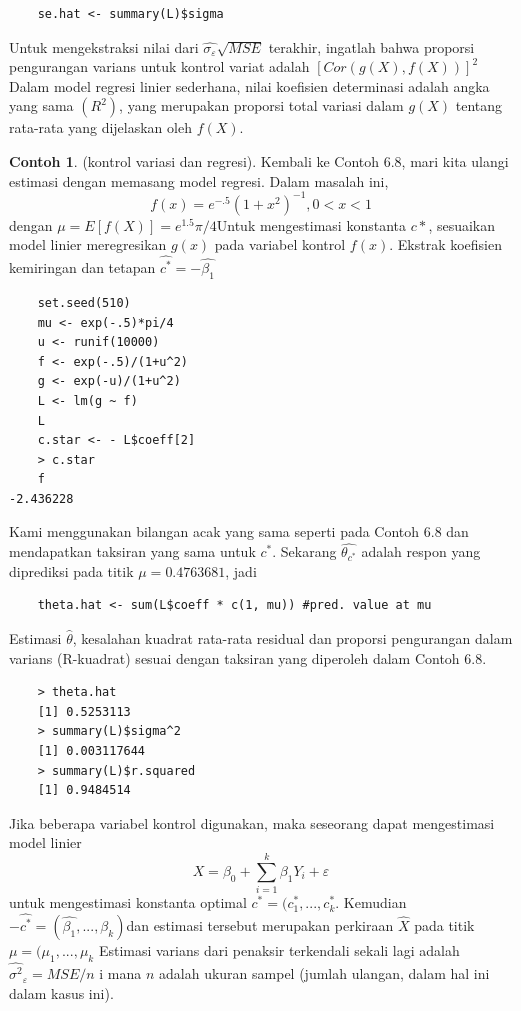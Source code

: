 \documentclass[a4paper,12pt]{article}
\theoremstyle{definition}
\newtheorem{example}{Contoh}[section]
\begin{document}
\begin{lstlisting}
    se.hat <- summary(L)$sigma
\end{lstlisting}
Untuk mengekstraksi nilai dari $\widehat{\sigma _{\varepsilon }}\sqrt{MSE}$
terakhir, ingatlah bahwa proporsi pengurangan varians untuk kontrol variat adalah $\left [ Cor(g(X),f(X)) \right ]^{2}$Dalam model regresi linier sederhana, nilai koefisien determinasi adalah angka yang sama $(R^{2})$, yang merupakan proporsi total variasi dalam $g(X)$ tentang rata-rata yang dijelaskan oleh $f (X)$.
\begin{example}
(kontrol variasi dan regresi). Kembali ke Contoh 6.8,
mari kita ulangi estimasi dengan memasang model regresi. Dalam masalah ini,
\begin{equation*}
    f(x)=e^{-.5}(1+x^{2})^{-1},0< x< 1
\end{equation*}
dengan $\mu=E\left [f(X)  \right ]=e^{1.5}\pi /4$Untuk mengestimasi konstanta $c{*}$, sesuaikan model linier
meregresikan $g(x)$ pada variabel kontrol $f (x)$. Ekstrak koefisien kemiringan dan tetapan $\widehat{c^{*}}=-\widehat{\beta_{1}}$
\begin{lstlisting}
    set.seed(510)
    mu <- exp(-.5)*pi/4
    u <- runif(10000)
    f <- exp(-.5)/(1+u^2)
    g <- exp(-u)/(1+u^2)
    L <- lm(g ~ f)
    L
    c.star <- - L$coeff[2]
    > c.star
    f
-2.436228
\end{lstlisting}
Kami menggunakan bilangan acak yang sama seperti pada Contoh 6.8 dan mendapatkan taksiran yang sama untuk $c^{*}$. Sekarang $\widehat{\theta_{c^{*}}}$ adalah respon yang diprediksi pada titik $\mu = 0.4763681$, jadi
\begin{lstlisting}
    theta.hat <- sum(L$coeff * c(1, mu)) #pred. value at mu
\end{lstlisting}
Estimasi $\widehat{\theta}$, kesalahan kuadrat rata-rata residual dan proporsi pengurangan dalam varians (R-kuadrat) sesuai dengan taksiran yang diperoleh dalam Contoh 6.8.
\begin{lstlisting}
    > theta.hat
    [1] 0.5253113
    > summary(L)$sigma^2
    [1] 0.003117644
    > summary(L)$r.squared
    [1] 0.9484514
\end{lstlisting}
Jika beberapa variabel kontrol digunakan, maka seseorang dapat mengestimasi model linier
\begin{equation*}
    X=\beta _{0}+\sum_{i=1}^{k}\beta_{1}Y_{i}+\varepsilon 
\end{equation*}
untuk mengestimasi konstanta optimal $c^{*}=(c^{*}_{1},...,c^{*}_{k}$. Kemudian $-\widehat{c^{*}}=(\widehat{\beta_{1}},...,\beta_{k})$dan estimasi tersebut merupakan perkiraan $\widehat{X}$ pada titik $\mu=(\mu_{1},...,\mu_{k}$ Estimasi varians dari penaksir terkendali sekali lagi adalah $\widehat{\sigma^{2}}_{\varepsilon }=MSE/n$ i mana $n$ adalah ukuran sampel (jumlah ulangan, dalam hal ini dalam kasus ini).
\end{example}
\end{document}
